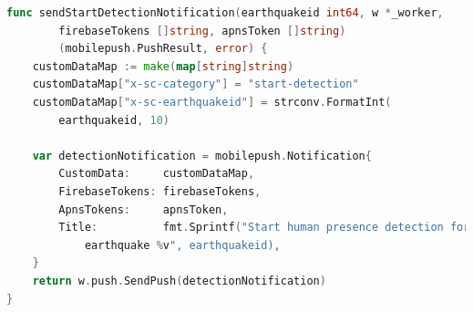 \documentclass[main.tex]{subfiles}
\begin{document}
\begin{lstlisting}[language=go]
func sendStartDetectionNotification(earthquakeid int64, w *_worker,
        firebaseTokens []string, apnsToken []string) 
        (mobilepush.PushResult, error) {
    customDataMap := make(map[string]string)
    customDataMap["x-sc-category"] = "start-detection"
    customDataMap["x-sc-earthquakeid"] = strconv.FormatInt(
        earthquakeid, 10)
    
    var detectionNotification = mobilepush.Notification{
        CustomData:     customDataMap,
        FirebaseTokens: firebaseTokens,
        ApnsTokens:     apnsToken,
        Title:          fmt.Sprintf("Start human presence detection for 
            earthquake %v", earthquakeid),
    }
    return w.push.SendPush(detectionNotification)
}
\end{lstlisting}
\end{document}
